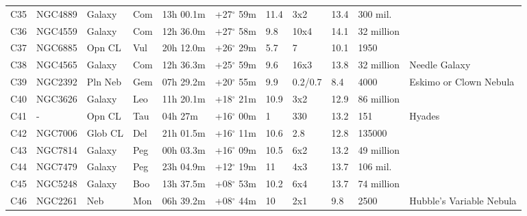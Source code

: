 \begin{longtable}{@{}lllllllllll@{}}
C35        & NGC4889     & Galaxy     & Com       & 13h 00.1m & +27$^{\circ}$ 59m  & 11.4      & 3x2                  & 13.4     & 300 mil.            &                                 \\
C36        & NGC4559     & Galaxy     & Com       & 12h 36.0m & +27$^{\circ}$ 58m  & 9.8       & 10x4                 & 14.1     & 32 million          &                                 \\
C37        & NGC6885     & Opn CL     & Vul       & 20h 12.0m & +26$^{\circ}$ 29m  & 5.7       & 7                    & 10.1     & 1950                &                                 \\
C38        & NGC4565     & Galaxy     & Com       & 12h 36.3m & +25$^{\circ}$ 59m  & 9.6       & 16x3                 & 13.8     & 32 million          & Needle Galaxy                   \\
C39        & NGC2392     & Pln Neb    & Gem       & 07h 29.2m & +20$^{\circ}$ 55m  & 9.9       & 0.2/0.7              & 8.4      & 4000                & Eskimo or Clown Nebula          \\
C40        & NGC3626     & Galaxy     & Leo       & 11h 20.1m & +18$^{\circ}$ 21m  & 10.9      & 3x2                  & 12.9     & 86 million          &                                 \\
C41        & -           & Opn CL     & Tau       & 04h 27m   & +16$^{\circ}$ 00m  & 1         & 330                  & 13.2     & 151                 & Hyades                          \\
C42        & NGC7006     & Glob CL    & Del       & 21h 01.5m & +16$^{\circ}$ 11m  & 10.6      & 2.8                  & 12.8     & 135000              &                                 \\
C43        & NGC7814     & Galaxy     & Peg       & 00h 03.3m & +16$^{\circ}$ 09m  & 10.5      & 6x2                  & 13.2     & 49 million          &                                 \\
C44        & NGC7479     & Galaxy     & Peg       & 23h 04.9m & +12$^{\circ}$ 19m  & 11        & 4x3                  & 13.7     & 106 mil.            &                                 \\
C45        & NGC5248     & Galaxy     & Boo       & 13h 37.5m & +08$^{\circ}$ 53m  & 10.2      & 6x4                  & 13.7     & 74 million          &                                 \\
C46        & NGC2261     & Neb        & Mon       & 06h 39.2m & +08$^{\circ}$ 44m  & 10        & 2x1                  & 9.8      & 2500                & Hubble's Variable Nebula        \\

\end{longtable}

